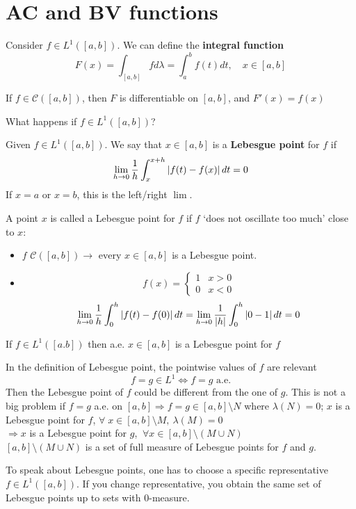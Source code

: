 
\section{AC and BV functions}

Consider \(f \in L^1\left([a,b]\right)\). We can define the \textbf{integral function}
\[F(x) = \int_{[a,b]} f d\lambda = \int_a^b f(t)dt , \quad x \in [a,b]\]

If \(f \in \mathcal{C}\left(\left[a, b\right]\right)\), then \(F\) is differentiable on \(\left[a, b\right]\), and \(F'(x)=f(x)\)

What happens if \(f \in L^1([a, b])\)?



\begin{definition}
    Given \(f \in L^1([a,b])\). We say that \(x \in [a,b]\) is a \textbf{Lebesgue point} for \(f\) if 
    \[
        \lim_{h \to 0} \frac{1}{h} \int_x^{x+h} \abs{f(t) - f(x)} \, dt = 0
    \]
    If \(x=a\) or \(x=b\), this is the left/right \(\lim\).
\end{definition}
\begin{remark}
    A point \(x\) is called a Lebesgue point for \(f\) if \(f\) `does not oscillate too much' close to \(x\):
    \begin{itemize}
        \item \(f\) \(\mathcal{C}([a,b]) \to \text{ every } x \in [a,b]\) is a Lebesgue point.
        \item \[
            f(x) = \begin{cases}
                1  & x > 0 \\
            0 & x < 0
            \end{cases}
        \]
        \[
            \lim_{h \to 0} \frac{1}{h} \int_0^{h} \abs{f(t) - f(0)} \, dt = \lim_{h \to 0} \frac{1}{\abs{h}} \int_0^{h} \abs{0 - 1} \, dt = 0
        \]
    \end{itemize}
\end{remark}
\begin{theorem}[Lebesgue]
    If \(f \in L^1([a.b])\) then a.e. \(x \in [a,b]\) is a Lebesgue point for \(f\)
\end{theorem}
\begin{remark}
    In the definition of Lebesgue point, the pointwise values of \(f\) are relevant 
    \[
        f = g \in L^1 \Leftrightarrow f = g \text{ a.e.}
    \]
    Then the Lebesgue point of \(f\) could be different from the one of \(g\).  
    This is not a big problem if \(f = g\) a.e. on \([a,b] \Rightarrow f = g \in [a,b]\setminus N\) where \(\lambda(N) = 0\); \(x\) is a Lebesgue point for \(f\), \(\forall \; x \in \left[a, b\right] \setminus M, \ \lambda(M)=0\) \\
    \(\Rightarrow x \) is a Lebesgue point for \(g\), \(\ \forall x \in \left[a, b\right] \setminus (M \cup N)\) \\
    \(\left[a, b\right] \setminus (M \cup N)\) is a set of full measure of Lebesgue points for \(f\) and \(g\).
\end{remark}
To speak about Lebesgue points, one has to choose a specific representative \(f \in L^1([a,b])\). If you change representative, you obtain the same set of Lebesgue points up to sets with \(0\)-measure.

